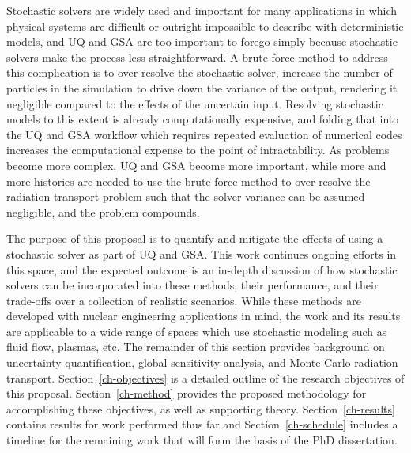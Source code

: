 Stochastic solvers are widely used and important for many applications in which physical systems are difficult or outright impossible to describe with deterministic models, and UQ and GSA are too important to forego simply because stochastic solvers make the process less straightforward. A brute-force method to address this complication is to over-resolve the stochastic solver, \eg increase the number of particles in the simulation to drive down the variance of the output, rendering it negligible compared to the effects of the uncertain input. Resolving stochastic models to this extent is already computationally expensive, and folding that into the UQ and GSA workflow which requires repeated evaluation of numerical codes increases the computational expense to the point of intractability. As problems become more complex, UQ and GSA become more important, while more and more histories are needed to use the brute-force method to over-resolve the radiation transport problem such that the solver variance can be assumed negligible, and the problem compounds. 

The purpose of this proposal is to quantify and mitigate the effects of using a stochastic solver as part of UQ and GSA. This work continues ongoing efforts in this space, and the expected outcome is an in-depth discussion of how stochastic solvers can be incorporated into these methods, their performance, and their trade-offs over a collection of realistic scenarios.
While these methods are developed with nuclear engineering applications in mind, the work and its results are applicable to a wide range of spaces which use stochastic modeling such as fluid flow, plasmas, etc.
The remainder of this section provides background on uncertainty quantification, global sensitivity analysis, and Monte Carlo radiation transport. Section~\ref{ch-objectives} is a detailed outline of the research objectives of this proposal. Section~\ref{ch-method} provides the proposed methodology for accomplishing these objectives, as well as supporting theory. Section~\ref{ch-results} contains results for work performed thus far and Section~\ref{ch-schedule} includes a timeline for the remaining work that will form the basis of the PhD dissertation. 


